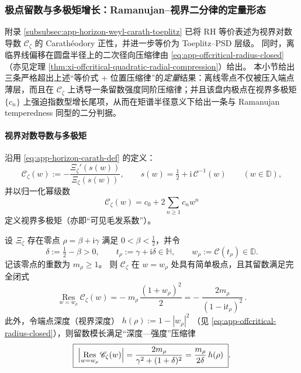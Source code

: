 \subsubsection{极点留数与多极矩增长：Ramanujan--视界二分律的定量形态}\label{subsubsec:xi-horizon-residue-multipole-temperedness}
附录 \ref{subsubsec:app-horizon-weyl-carath-toeplitz} 已将 RH 等价表述为视界对数导数
\(\mathscr{C}_{\zeta}\) 的 Carath\'eodory 正性，并进一步等价为 Toeplitz--PSD 层级。
同时，离临界线偏移在圆盘半径上的二次径向压缩律由 \eqref{eq:app-offcritical-radius-closed}（亦见定理 \ref{thm:xi-offcritical-quadratic-radial-compression}）给出。
本小节给出三条严格超出上述“等价式 + 位置压缩律”的\emph{定量}结果：离线零点不仅被压入端点薄层，而且在 \(\mathscr{C}_{\zeta}\) 上诱导一条留数强度同阶压缩律；并且该盘内极点在视界多极矩 \(\{c_n\}\) 上强迫指数型增长尾项，从而在矩谱半径意义下给出一条与 Ramanujan temperedness 同型的二分判据。

\paragraph{视界对数导数与多极矩}
沿用 \eqref{eq:app-horizon-carath-def} 的定义：
\[
\mathscr{C}_{\zeta}(w):=-\frac{\Xi_{\zeta}'(s(w))}{\Xi_{\zeta}(s(w))},\qquad
s(w)=\tfrac12+\mathrm{i}\,\mathcal{C}^{-1}(w)\qquad(w\in\mathbb{D}),
\]
并以归一化幂级数
\begin{equation}\label{eq:xi-horizon-carath-series-recall}
\mathscr{C}_{\zeta}(w)=c_0+2\sum_{n\ge 1}c_n w^n
\end{equation}
定义视界多极矩（亦即“可见毛发系数”）。

\begin{theorem}\label{thm:xi-horizon-pole-residue-depth-strength}
设 \(\Xi_{\zeta}\) 存在零点 \(\rho=\beta+\mathrm{i}\gamma\) 满足 \(0<\beta<\tfrac12\)，并令
\[
\delta:=\tfrac12-\beta>0,\qquad
t_{\rho}:=\gamma+\mathrm{i}\delta\in\mathbb{H},\qquad
w_{\rho}:=\mathcal{C}(t_{\rho})\in\mathbb{D}.
\]
记该零点的重数为 \(m_{\rho}\ge 1\)。
则 \(\mathscr{C}_{\zeta}\) 在 \(w=w_{\rho}\) 处具有简单极点，且其留数满足完全闭式
\begin{equation}\label{eq:xi-horizon-pole-residue-closed}
\boxed{\;
\operatorname*{Res}_{w=w_{\rho}}\mathscr{C}_{\zeta}(w)
=-\;m_{\rho}\,\frac{(1+w_{\rho})^{2}}{2}
=-\;\frac{2m_{\rho}}{(1-\mathrm{i}t_{\rho})^{2}}\,.
\;}
\end{equation}
此外，令端点深度（视界深度）
\(
h(\rho):=1-|w_{\rho}|^{2}
\)
（见 \eqref{eq:app-offcritical-radius-closed}），则留数模长满足“深度—强度”压缩律
\begin{equation}\label{eq:xi-horizon-depth-strength-law}
\boxed{\;
\Bigl|\operatorname*{Res}_{w=w_{\rho}}\mathscr{C}_{\zeta}(w)\Bigr|
=\frac{2m_{\rho}}{\gamma^{2}+(1+\delta)^{2}}
=\frac{m_{\rho}}{2\delta}\,h(\rho)\; }.
\end{equation}
\end{theorem}

